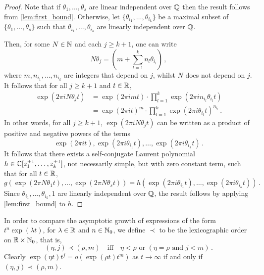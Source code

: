 \begin{proof}
Note that if $\theta_{1}, \ldots, \theta_{s}$ are linear independent over $\mathbb{Q}$ then the result follows from \cref{lem:first_bound}.
Otherwise, let $\lbrace \theta_{i_{1}}, \ldots, \theta_{i_{k}} \rbrace$ be a maximal subset of $\lbrace \theta_{1}, \ldots, \theta_{s} \rbrace$ such that $\theta_{i_{1}}, \ldots, \theta_{i_{k}}$ are linearly independent over $\mathbb{Q}$.

Then, for some $N\in\mathbb{N}$ and each $j\geq k+1$, one can write
\begin{equation*}
N\theta_{j}= \left( m  +\sum\limits_{l=1}^{k} n_{l}\theta_{i_{l}} \right) \, ,
\end{equation*}
where $m,n_{i_{1}},\ldots,n_{i_{k}}$ are integers that depend on $j$, whilst $N$ does not depend on $j$.  It follows that for all $j\geq k+1$ and
$t \in \mathbb{R}$,
\begin{align*}
\exp(2 \pi i N\theta_{j} t) &= \exp( 2 \pi i m t) \cdot \prod\limits_{l=1}^{k} \exp(2 \pi i  n_{i_{l}} \theta_{i_{l}} t) \\
&= \exp(2 \pi i t)^{m} \cdot \prod\limits_{l=1}^{k} \exp(2 \pi i \theta_{i_{l}} t)^{n_{i_{l}}}  \, .
\end{align*}
In other words, for all $j \geq k+1$, $\exp(2 \pi i N \theta_{j} t)$ can be written as a product of positive and negative powers of the terms
\begin{equation*}
  \exp(2 \pi i t), \exp(2 \pi i \theta_{i_{1}} t), \ldots, \exp(2 \pi i \theta_{i_{k}} t) \, .
\end{equation*}
It follows that there exists a self-conjugate Laurent polynomial
$h\in\mathbb{C} [z_1^{\pm 1},\ldots,z_k^{\pm 1}]$, not necessarily
simple, but with zero constant term, such that for all
$t\in \mathbb{R}$,
\[ g(\exp(2 \pi N \theta_{1} t), \ldots, \exp(2 \pi N \theta_{s} t)) =
  h(\exp(2 \pi i \theta_{i_{1}} t),\ldots,\exp(2 \pi i \theta_{i_{k}} t)) \, .\]
Since $\theta_{i_{1}},\ldots,\theta_{i_{k}},1$ are linearly independent over $\mathbb{Q}$, the result follows by applying \cref{lem:first_bound}
to $h$.
\end{proof}


In order to compare the asymptotic growth of expressions of the form
$t^{n}\exp(\lambda t)$, for $\lambda\in\mathbb{R}$ and
$n\in\mathbb{N}_0$, we define $\prec$ to be the lexicographic order on
$\mathbb{R}\times\mathbb{N}_{0}$, that is,
\begin{equation*}
(\eta,j)\prec (\rho,m) \quad \mbox{iff} \quad
\eta<\rho \mbox{ or } (\eta = \rho \mbox{ and } j< m) \, .
\end{equation*}
Clearly $\exp(\eta t)t^{j}=o(\exp(\rho t)t^{m})$ as $t\rightarrow \infty$ if and only if $(\eta,j)\prec (\rho,m)$.

